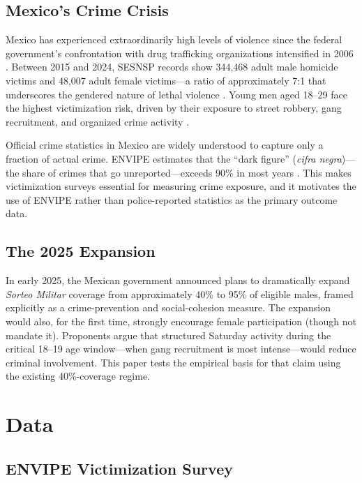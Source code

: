 \documentclass[12pt]{article}
\begin{document}
\subsection{Mexico's Crime Crisis}

Mexico has experienced extraordinarily high levels of violence since the federal government's confrontation with drug trafficking organizations intensified in 2006 \citep{dell2015trafficking, trejo2012drugwar}. Between 2015 and 2024, SESNSP records show 344,468 adult male homicide victims and 48,007 adult female victims---a ratio of approximately 7:1 that underscores the gendered nature of lethal violence \citep{sesnsp2024incidencia}. Young men aged 18--29 face the highest victimization risk, driven by their exposure to street robbery, gang recruitment, and organized crime activity \citep{castillo2020organized}.

Official crime statistics in Mexico are widely understood to capture only a fraction of actual crime. ENVIPE estimates that the ``dark figure'' (\textit{cifra negra})---the share of crimes that go unreported---exceeds 90\% in most years \citep{inegi2024envipe}. This makes victimization surveys essential for measuring crime exposure, and it motivates the use of ENVIPE rather than police-reported statistics as the primary outcome data.

\subsection{The 2025 Expansion}

In early 2025, the Mexican government announced plans to dramatically expand \textit{Sorteo Militar} coverage from approximately 40\% to 95\% of eligible males, framed explicitly as a crime-prevention and social-cohesion measure. The expansion would also, for the first time, strongly encourage female participation (though not mandate it). Proponents argue that structured Saturday activity during the critical 18--19 age window---when gang recruitment is most intense---would reduce criminal involvement. This paper tests the empirical basis for that claim using the existing 40\%-coverage regime.


\section{Data}
\label{sec:data}

\subsection{ENVIPE Victimization Survey}
\end{document}
